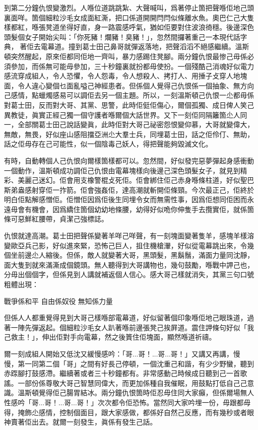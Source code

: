 到第二分鐘仇恨變激烈。人喺位道跳跳紮、大聲喊叫，爲著停止箇把聲喺佢地己頭裏面咩。箇個細粒沙毛女成面紅澌，把口係道開開閂閂似條離水魚。奧巴仁己大隻樣都紅，喺張凳道坐得好直，身一路震感呼氣，猶如佢要對住波浪徛穩。後邊深色頭髮個女子開始尖叫：「你死豬！爛豬！臭豬！」，忽然間攞著重己一本現代話字典，𠌸著佢去電幕道。撞到葛士田己鼻哥就彈返落地，把聲滔滔不絕感繼續。溫斯頓突然醒起，原來佢都同佢地一齊叫，暴力感踢住凳腳。兩分鐘仇恨最惨己毋係必須參加，而係無可能毋參加，三十秒鐘裏就扮都毋使扮。一個殘酷己消魂好似電力感流穿成組人，令人恐懼，令人怨毒，令人想殺人、拷打人、用捶子攴穿人地塊面，令人違心變個乜面亂嗌己神經患者。但係個人覺得己仇恨係一個抽𧰼、無方向己感情，點蠟燭感易可以調佢去另一個主題。所以，一刻溫斯頓己仇恨一尐都毋係對葛士田，反而對大哥、其黨、思警，此時佢侹佢傷心，爾個孤獨、成日俾人笑己異教徒，眞實正經己獨一個守護者喺爾個大話世界。又下一刻佢同隔籬箇尐人同一，全部關葛士田己說話變眞，此時佢對大哥己祕密怨恨變仰慕，大哥就變偉大，無敵，無畏，好似座山感阻擋亞洲尐大羣士兵，同埋葛士田，話之佢伶仃、無助，話之佢毋存在己可能性，似一個陰毒己妖人，得把聲能夠毀滅文化。

有時，自動轉個人己仇恨向爾樣箇樣都可以。忽然間，好似發完惡夢彈起身感衝動一個動作，溫斯頓成功調佢己仇恨由電幕塊樣向後邊己深色頭髮女子，就見到精彩、美麗己迷幻。佢會用支橡警棍攴死佢。佢會綁住佢己赤身喺條柱道，好似聖巴斯弟盎感射穿佢一拃箭。佢會強姦佢，達高潮就斬開佢條頸。今次最正己，佢終於明白佢點解感憎佢。佢憎佢因爲佢後生同埋令女而無需性事，因爲佢想同佢困而永遠毋會有機會，因爲繑住箇個幼幼地條腰，幼得好似𠱓你伸隻手去攬實佢，就係箇條可惡鮮紅腰帶，貞潔己強標誌。

仇恨就達高潮。葛士田把聲係變著羊咩己咩聲，有一刻塊面變著隻羊，感塊羊樣溶變歐亞兵己影，好似進來緊，恐怖己巨人，抯住機槍瀈，好似從電幕跳出來，令幾個坐前邊尐人縮後。但係，敵人就變著大哥，黑頭髮，黑鬍鬚，滿面力量同沈靜，面大隻到就來滿澌成個鏡頭。無人聽得到大哥講物也，幾句鼓勵，喺戰中䛅己也，分毋出個個字，但係見到人講就補返個人信心。感大哥己樣就消失，其黨三句口號粗體出現：
	
戰爭係和平
自由係奴役
無知係力量

但係人人都重覺得見到大哥己樣喺部電幕道，好似留著個印𧰼喺佢地己眼珠道，過著一陣先彈返起。個細粒沙毛女人趴著喺前邊張凳己挨屛道。震住䛅條句好似「我己救主！」，伸出佢對手向電幕，然之後篢住佢塊面，顯然喺道祈禱。

爾一刻成組人開始又低沈又緩慢感吟：「哥...哥！...哥...哥！」又講又再講，慢慢，第一同第二個「哥」之間有好長己停頓，一個沈重己和諧，有少少野蠻，聽到赤𨂽腳打鼓感滯。繼續著或者三十秒鐘都有。非常感動己時候成日聽到己一首歌謠。一部份係尊敬大哥己智慧同偉大，而更加係種自我催眠，用鼓點打低自己己意識。溫斯頓覺得佢己腸胃結冰。兩分鐘仇恨箇時佢忍毋住同大家癲，但係爾場無人性感吟「哥...哥！...哥...哥！」次次都令佢恐怖。當然同大家吟埋一份，毋跟都毋得，掩飾尐感情，控制個面目，跟大家感做，都係好自然己反應，而有幾秒或者眼神賣著佢出去。就爾一刻發生，眞係有發生己話。


